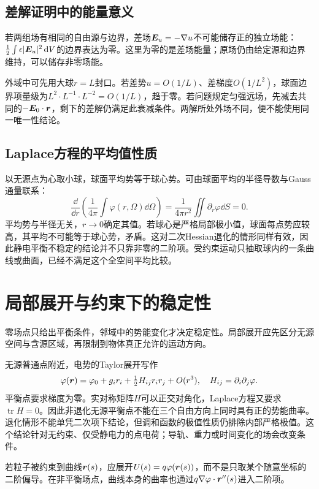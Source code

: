 \subsection{差解证明中的能量意义}
若两组场有相同的自由源与边界，差场$\bm{E}_u=-\nabla u$不可能储存正的独立场能：$\tfrac12\int\epsilon|\bm{E}_u|^2\mathop{}\!\mathrm d V$的边界表达为零。这里为零的是差场能量；原场仍由给定源和边界维持，可以储存非零场能。

外域中可先用大球$r=L$封口。若差势$u=O(1/L)$、差梯度$O(1/L^2)$，球面边界项量级为$L^2\cdot L^{-1}\cdot L^{-2}=O(1/L)$，趋于零。若问题规定匀强远场，先减去共同的$-\bm{E}_0\cdot\bm{r}$，剩下的差解仍满足此衰减条件。两解所处外场不同，便不能使用同一唯一性结论。

\subsection{Laplace方程的平均值性质}
以无源点为心取小球，球面平均势等于球心势。可由球面平均的半径导数与Gauss通量联系：
\[\frac\dd{\dd r}\left(\frac1{4\pi}\int\varphi(r,\Omega)\dd\Omega\right)
=\frac1{4\pi r^2}\iint\partial_r\varphi\dd S=0.
\]
平均势与半径无关，$r\to0$确定其值。若球心是严格局部极小值，球面每点势应较高，其平均不可能等于球心势，矛盾。这对二次Hessian退化的情形同样有效，因此静电平衡不稳定的结论并不只靠非零的二阶项。受约束运动只抽取球内的一条曲线或曲面，已经不满足这个全空间平均比较。


\section{局部展开与约束下的稳定性}\label{sec:es2-stability}\label{sec:es2-local}
零场点只给出平衡条件，邻域中的势能变化才决定稳定性。局部展开应先区分无源空间与含源区域，再限制到物体真正允许的运动方向。

无源普通点附近，电势的Taylor展开写作
\[\varphi(\bm{r})=\varphi_0+g_ir_i+\tfrac12H_{ij}r_ir_j+O(r^3),\quad
H_{ij}=\partial_i\partial_j\varphi.\]
平衡点要求梯度为零。实对称矩阵$H$可以正交对角化，Laplace方程又要求$\operatorname{tr}H=0$。因此非退化无源平衡点不能在三个自由方向上同时具有正的势能曲率。退化情形不能单凭二次项下结论，但调和函数的极值性质仍排除内部严格极值。这个结论针对无约束、仅受静电力的点电荷；导轨、重力或时间变化的场会改变条件。

若粒子被约束到曲线$\bm{r}(s)$，应展开$U(s)=q\varphi(\bm{r}(s))$，而不是只取某个随意坐标的二阶偏导。在非平衡场点，曲线本身的曲率也通过$q\nabla\varphi\cdot\bm{r}''(s)$进入二阶项。


